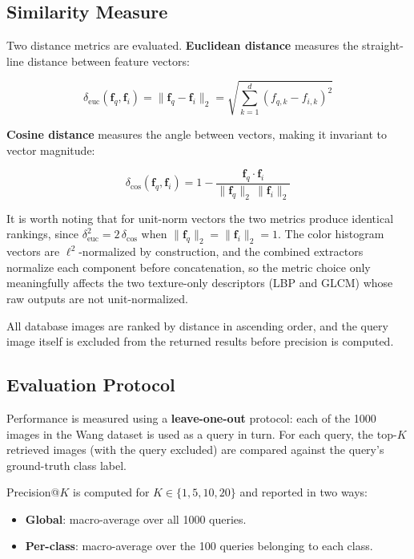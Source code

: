 \documentclass[12pt, a4paper]{article}
\begin{document}
\subsection{Similarity Measure}

Two distance metrics are evaluated. \textbf{Euclidean distance} measures the straight-line
distance between feature vectors:

\begin{equation}
    \delta_{\text{euc}}(\mathbf{f}_q, \mathbf{f}_i)
    = \|\mathbf{f}_q - \mathbf{f}_i\|_2
    = \sqrt{\sum_{k=1}^{d} (f_{q,k} - f_{i,k})^2}
\end{equation}

\textbf{Cosine distance} measures the angle between vectors, making it invariant to
vector magnitude:

\begin{equation}
    \delta_{\text{cos}}(\mathbf{f}_q, \mathbf{f}_i)
    = 1 - \frac{\mathbf{f}_q \cdot \mathbf{f}_i}{\|\mathbf{f}_q\|_2\,\|\mathbf{f}_i\|_2}
\end{equation}

It is worth noting that for unit-norm vectors the two metrics produce identical rankings,
since $\delta_{\text{euc}}^2 = 2\,\delta_{\text{cos}}$ when
$\|\mathbf{f}_q\|_2 = \|\mathbf{f}_i\|_2 = 1$. The color histogram vectors are
$\ell^2$-normalized by construction, and the combined extractors normalize each component
before concatenation, so the metric choice only meaningfully affects the two
texture-only descriptors (LBP and GLCM) whose raw outputs are not unit-normalized.

All database images are ranked by distance in ascending order, and the query image itself
is excluded from the returned results before precision is computed.

\subsection{Evaluation Protocol}

Performance is measured using a \textbf{leave-one-out} protocol: each of the 1000 images
in the Wang dataset is used as a query in turn. For each query, the top-$K$ retrieved images
(with the query excluded) are compared against the query's ground-truth class label.

Precision@$K$ is computed for $K \in \{1, 5, 10, 20\}$ and reported in two ways:

\begin{itemize}[noitemsep]
    \item \textbf{Global}: macro-average over all 1000 queries.
    \item \textbf{Per-class}: macro-average over the 100 queries belonging to each class.
\end{itemize}
\end{document}

